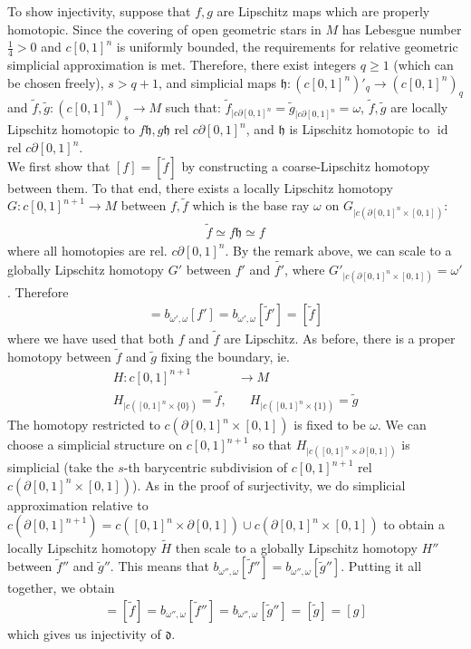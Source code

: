 \documentclass[a4paper,11pt]{article}
\theoremstyle{definition}
\theoremstyle{plain}
\theoremstyle{remark}
\DeclareMathOperator{\id}{id}
\begin{document}
{To show injectivity, suppose that $f,g$ are Lipschitz maps which are properly homotopic. Since the covering of open geometric stars in $M$ has Lebesgue number $\frac{1}{4}>0$ and $c[0,1]^n$ is uniformly bounded, the requirements for relative geometric simplicial approximation is met. Therefore, there exist integers $q\geq 1$ (which can be chosen freely), $s>q+1$, and simplicial maps $\mathfrak{h}: (c[0,1]^n)'_{q}\rightarrow (c[0,1]^n)_{q}$ and $\tilde{f},\tilde{g}: (c[0,1]^n)_{s}\rightarrow M$ such that: $\tilde{f}_{|c \partial[0,1]^n} = \tilde{g}_{|c \partial[0,1]^n} = \omega$, $\tilde{f},\tilde{g}$ are locally Lipschitz homotopic to $f \mathfrak{h},g \mathfrak{h}$ rel $c\partial [0,1]^n$, and $\mathfrak{h}$ is Lipschitz homotopic to $\id$ rel  $c\partial [0,1]^n$.\\

We first show that $[f] = [\tilde{f}]$ by constructing a coarse-Lipschitz homotopy between them. To that end, there exists a locally Lipschitz homotopy $G: c[0,1]^{n+1}\rightarrow M$ between $f,\tilde{f}$ which is the base ray $\omega$ on $G_{|c (\partial [0,1]^n \times [0,1])}$:
\begin{align*}
\tilde{f} \simeq f\mathfrak{h} \simeq f
\end{align*}
where all homotopies are rel. $c \partial[0,1]^n$. By the remark above, we can scale to a globally Lipschitz homotopy $G'$ between $f'$ and $\tilde{f'}$, where $G'_{|c (\partial [0,1]^n \times [0,1])} = \omega'$. Therefore
\begin{align*}
[f] = b_{\omega',\omega} [f'] = b_{\omega',\omega}[\tilde{f}'] = [\tilde{f}]
\end{align*}
where we have used that both $f$ and $\tilde{f}$ are Lipschitz. As before, there is a proper homotopy between $\tilde{f}$ and $\tilde{g}$ fixing the boundary, ie.
\begin{align*}
H: c[0,1]^{n+1} & \rightarrow M\\
H_{|c([0,1]^n \times \{0\})} = \tilde{f}, &\quad H_{|c([0,1]^n \times \{1\})} = \tilde{g}
\end{align*}
The homotopy restricted to $c(\partial[0,1]^n \times [0,1])$ is fixed to be $\omega$. We can choose a simplicial structure on $c[0,1]^{n+1}$ so that $H_{|c([0,1]^n \times\partial [0,1])}$ is simplicial (take the $s$-th barycentric subdivision of $c[0,1]^{n+1}$ rel $c(\partial [0,1]^n \times [0,1])$). As in the proof of surjectivity, we do simplicial approximation relative to $c(\partial [0,1]^{n+1})=c([0,1]^n \times \partial [0,1]) \cup c(\partial[0,1]^n \times [0,1])$ to obtain a locally Lipschitz homotopy $\tilde{H}$ then scale to a globally Lipschitz homotopy $H''$ between $\tilde{f}''$ and $\tilde{g}''$. This means that $b_{\omega'',\omega}[\tilde{f}''] = b_{\omega'',\omega} [\tilde{g}'']$. Putting it all together, we obtain
\begin{align*}
[f] = [\tilde{f}] = b_{\omega'',\omega}[\tilde{f}''] = b_{\omega'',\omega} [\tilde{g}''] = [\tilde{g}] = [g]
\end{align*}
which gives us injectivity of $\mathfrak{d}$. 
}
\end{document}
